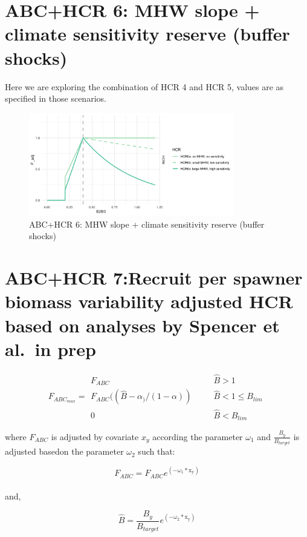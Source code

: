 \documentclass[
]{article}
\begin{document}
\section{ABC+HCR 6: MHW slope + climate sensitivity reserve (buffer
shocks)}\label{abchcr-6-mhw-slope-climate-sensitivity-reserve-buffer-shocks}

Here we are exploring the combination of HCR 4 and HCR 5, values are as
specified in those scenarios.

\begin{figure}
\centering
\includegraphics[width=0.8\textwidth,height=\textheight]{../../Figs/HCR_figs/HCR6.png}
\caption{ABC+HCR 6: MHW slope + climate sensitivity reserve (buffer
shocks)}
\end{figure}

\section{ABC+HCR 7:Recruit per spawner biomass variability adjusted HCR
based on analyses by Spencer et al.~in
prep}\label{abchcr-7recruit-per-spawner-biomass-variability-adjusted-hcr-based-on-analyses-by-spencer-et-al.-in-prep}

\[F_{ABC_{max}} = \begin{array}{ll}  
 F_{ABC} &~~~~~~~~ \hat{B}>1 \\  
 F_{ABC}((\hat{B}-\alpha_)/(1-\alpha)) &~~~~~~~~ \hat{B} < 1 \leq B_{lim} \\ 
 0 &~~~~~~~~ \hat{B} < B_{lim}  
 \end{array}\]

where \(F_{ABC}\) is adjusted by covariate \(x_y\) according the
parameter \(\omega_1\) and \(\frac{B_y}{B_{target}}\) is adjusted
basedon the parameter \(\omega_2\) such that:

\[ F_{ABC} =  F_{ABC}e^{(-\omega_1*\mathrm{x_y})}\]\\
and,

\[ \hat{B} = \frac{B_y}{B_{target}}e^{(-\omega_2*\mathrm{x_y})}\]
\end{document}
